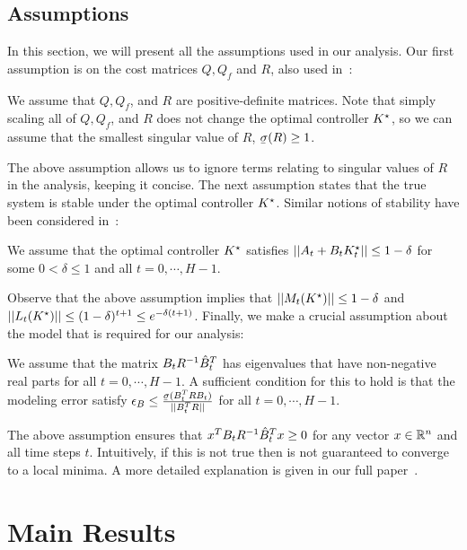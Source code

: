\subsection{Assumptions}
\label{sec:assumptions}
In this section, we will present all the assumptions used in our analysis.
Our first assumption is on the cost matrices $Q, Q_f$ and $R$, also used in~\cite{mania19}:
\begin{assumption}
  We assume that $Q, Q_f$, and $R$ are positive-definite matrices. Note that simply
  scaling all of $Q, Q_f$, and $R$ does not change the optimal controller $K^\star$, so we can
  assume that the smallest singular value of $R$, $\ubar{\sigma}(R) \geq 1$.
  \label{assumption:singularvalue}
\end{assumption}
The above assumption allows us to ignore terms relating to singular
values of $R$ in the analysis, keeping it concise. The
next assumption states that the true system is stable under the
optimal controller $K^\star$. Similar notions of stability have been considered in~\cite{cohen18}:
\begin{assumption}
  We assume that the optimal controller $K^\star$ satisfies
  $||A_{t} + B_{t}K^\star_{t}|| \leq 1 - \delta$ for some
  $0 < \delta \leq 1$ and all $t=0, \cdots, H-1$.
  \label{assumption:stability}
\end{assumption}
Observe that the above assumption implies that $||M_{t}(K^\star)|| \leq 1 - \delta$
and $||L_{t}(K^\star)|| \leq (1 - \delta)^{t+1} \leq e^{{-\delta(t+1)}}$.
Finally, we make a crucial assumption about the model that
is required for our \ILC{} analysis:
\begin{assumption}
  We assume that the matrix $B_{t}R^{-1}\hat{B}_{t}^{T}$ has eigenvalues that have
  non-negative real parts for all $t=0, \cdots, H-1$. A sufficient condition for
  this to hold is that the
  modeling error satisfy
  $\epsB \leq \frac{\ubar{\sigma}(B_{t}^{T}RB_{t})}{||B_{t}^{T}R||}$
  for all $t=0, \cdots, H-1$.
  \label{assumption:psd}
\end{assumption}
The above assumption ensures that $x^{T}B_{t}R^{-1}\hat{B}_{t}^{T}x \geq 0$ for any vector
$x \in \mathbb{R}^{n}$ and all time steps $t$. Intuitively, if this is not true then \ILC{} is not
guaranteed to converge to a local minima. A more detailed
explanation is given in our full paper~\cite{DBLP:journals/corr/abs-2111-09434}.

\section{Main Results}
\label{sec:main-results}

